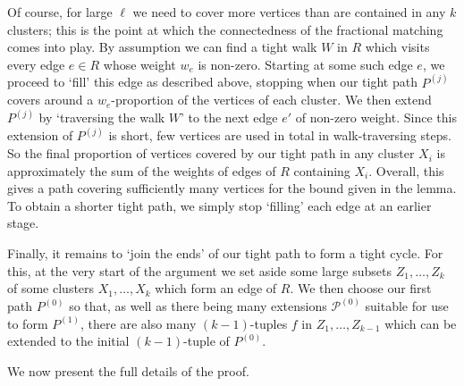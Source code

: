 \documentclass[12pt,a4paper]{amsart}
\newcommand{\paths}{\mathscr{P}}
\begin{document}
Of course, for large $\ell$ we need to cover more vertices than are contained in
any $k$ clusters; this is the point at which the connectedness of the fractional
matching comes into play. By assumption we can find a tight walk $W$ in
$R$ which visits every edge $e \in R$ whose weight $w_e$ is non-zero. Starting
at some such edge $e$, we proceed to `fill' this edge as described above,
stopping when our tight path $P^{(j)}$ covers around a $w_e$-proportion of the
vertices of each cluster. We then extend $P^{(j)}$ by `traversing the walk $W$' to the next edge $e'$ of non-zero weight. Since this extension of $P^{(j)}$ is short, few
vertices are used in total in walk-traversing steps. So the final proportion of vertices
covered by our tight path in any cluster $X_i$ is approximately the sum of the
weights of edges of $R$ containing $X_i$. Overall, this gives a path covering
sufficiently many vertices for the bound given in the lemma. To obtain a shorter
tight path, we simply stop `filling' each edge at an earlier stage.

Finally, it remains to `join the ends' of our tight path to form a tight cycle.
For this, at the very start of the argument we set aside some large subsets
$Z_1, \dots, Z_k$ of some clusters $X_1, \dots, X_k$ which form an edge of $R$.
We then choose our first path $P^{(0)}$ so that, as well as there being many
extensions $\paths^{(0)}$ suitable for use to form $P^{(1)}$, there are also
many $(k-1)$-tuples $f$ in $Z_1, \dots, Z_{k-1}$ which can be extended to the
initial $(k-1)$-tuple of $P^{(0)}$.

We now present the full details of the proof.
\end{document}
